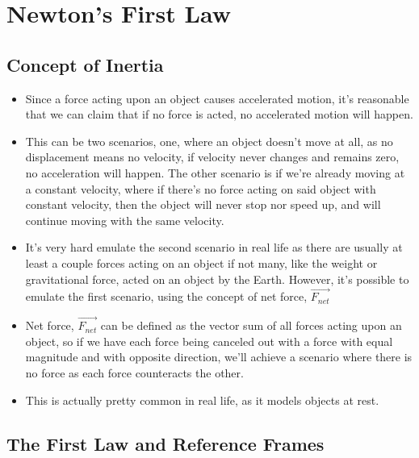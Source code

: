\documentclass[openany]{book}
\begin{document}
\section{Newton's First Law} 
\subsection{Concept of Inertia}
\begin{itemize}
    \item Since a force acting upon an object causes accelerated motion, it's reasonable that we can claim that if no force is acted, no accelerated motion will happen.
    \item This can be two scenarios, one, where an object doesn't move at all, as no displacement means no velocity, if velocity never changes and remains zero, no acceleration will happen. The other scenario is if we're already moving at a constant velocity, where if there's no force acting on said object with constant velocity, then the object will never stop nor speed up, and will continue moving with the same velocity.
    \item It's very hard emulate the second scenario in real life as there are usually at least a couple forces acting on an object if not many, like the weight or gravitational force, acted on an object by the Earth. However, it's possible to emulate the first scenario, using the concept of net force, $\vec{F_{net}}$
    \item Net force, $\vec{F_{net}}$ can be defined as the vector sum of all forces acting upon an object, so if we have each force being canceled out with a force with equal magnitude and with opposite direction, we'll achieve a scenario where there is no force as each force counteracts the other.
    \item This is actually pretty common in real life, as it models objects at rest.
\end{itemize}
\subsection{The First Law and Reference Frames}
\end{document}
